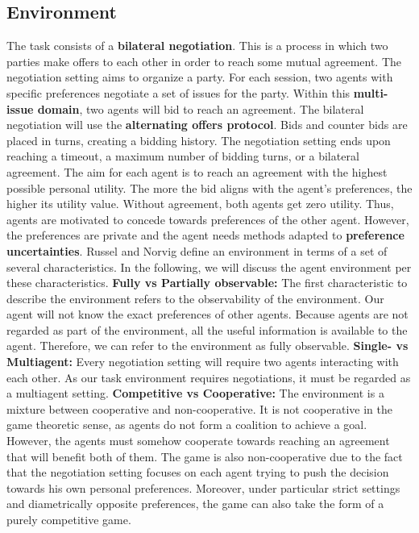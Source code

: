 \documentclass[a4paper,11pt]{article}
\theoremstyle{mytheor}
\begin{document}
\subsection{Environment} 
The task consists of a \textbf{bilateral negotiation}. This is a process in which two parties make offers to each other in order to reach some mutual agreement.\cite{encycPed} The negotiation setting aims to organize a party. For each session, two agents with specific preferences negotiate a set of issues for the party. Within this \textbf{multi-issue domain}, two agents will bid to reach an agreement. The bilateral negotiation will use the \textbf{alternating offers protocol}. Bids and counter bids are placed in turns, creating a bidding history. The negotiation setting ends upon reaching a timeout, a maximum number of bidding turns, or a bilateral agreement.\cite{Baarslag2016} The aim for each agent is to reach an agreement with the highest possible personal utility. The more the bid aligns with the agent's preferences, the higher its utility value. Without agreement, both agents get zero utility. Thus, agents are motivated to concede towards preferences of the other agent. However, the preferences are private and the agent needs methods adapted to \textbf{preference uncertainties}. 
Russel and Norvig define an environment in terms of a set of several characteristics.\cite{stuart2016artificial} In the following, we will discuss the agent environment per these characteristics. 
\textbf{Fully vs Partially observable:} The first characteristic to describe the environment refers to the observability of the environment. Our agent will not know the exact preferences of other agents. Because agents are not regarded as part of the environment, all the useful information is available to the agent. Therefore, we can refer to the environment as fully observable.
\textbf{Single- vs Multiagent:} Every negotiation setting will require two agents interacting with each other. As our task environment requires negotiations, it must be regarded as a multiagent setting.
\textbf{Competitive vs Cooperative:}
The environment is a mixture between cooperative and non-cooperative. It is not cooperative in the game theoretic sense, as agents do not form a coalition to achieve a goal. However, the agents must somehow cooperate towards reaching an agreement that will benefit both of them. The game is also non-cooperative due to the fact that the negotiation setting focuses on each agent trying to push the decision towards his own personal preferences. Moreover, under particular strict settings and diametrically opposite preferences, the game can also take the form of a purely competitive game.
\end{document}
